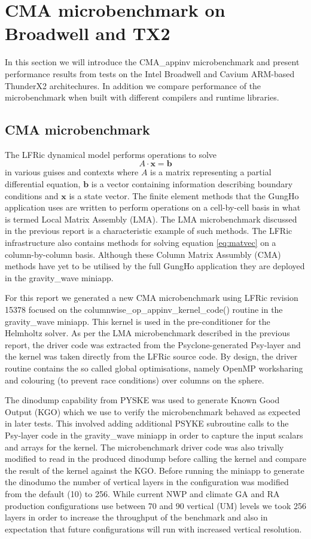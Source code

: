 \section{CMA microbenchmark on Broadwell and TX2}
In this section we will introduce the CMA\_appinv microbenchmark and present performance results from tests on the Intel Broadwell and Cavium ARM-based ThunderX2 architechures.
In addition we compare performance of the microbenchmark when built with different compilers and runtime libraries.

\subsection{CMA microbenchmark}

The LFRic dynamical model performs operations to solve
\begin{equation} \label{eq:matvec}
A \cdot \mathbf{x} = \mathbf{b}
\end{equation}
in various guises and contexts where $A$ is a matrix representing a partial differential equation, $\mathbf{b}$ is a vector containing information describing boundary conditions and $\mathbf{x}$ is a state vector.
The finite element methods that the GungHo application uses are written to perform operations on a cell-by-cell basis in what is termed Local Matrix Assembly (LMA).
The LMA microbenchmark discussed in the previous report is a characteristic example of such methods.
The LFRic infrastructure also contains methods for solving equation \ref{eq:matvec} on a column-by-column basis.
Although these Column Matrix Assumbly (CMA) methods have yet to be utilised by the full GungHo application they are deployed in the gravity\_wave miniapp.

For this report we generated a new CMA microbenchmark using LFRic revision 15378 focused on the columnwise\_op\_appinv\_kernel\_code() routine in the gravity\_wave miniapp.
This kernel is used in the pre-conditioner for the Helmholtz solver.
As per the LMA microbenchmark described in the previous report, the driver code was extracted from the Psyclone-generated Psy-layer and the kernel was taken directly from the LFRic source code.
By design, the driver routine contains the so called global optimisations, namely OpenMP worksharing and colouring (to prevent race conditions) over columns on the sphere.

The dinodump capability from PYSKE was used to generate Known Good Output (KGO) which we use to verify the microbenchmark behaved as expected in later tests.
This involved adding additional PSYKE subroutine calls to the Psy-layer code in the gravity\_wave miniapp in order to capture the input scalars and arrays for the kernel.
The microbenchmark driver code was also trivally modified to read in the produced dinodump before calling the kernel and compare the result of the kernel against the KGO.
Before running the miniapp to generate the dinodumo the number of vertical layers in the configuration was modified from the default (10) to 256.
While current NWP and climate GA and RA production configurations use between 70 and 90 vertical (UM) levels we took 256 layers in order to increase the throughput of the benchmark and also in expectation that future configurations will run with increased vertical resolution.


